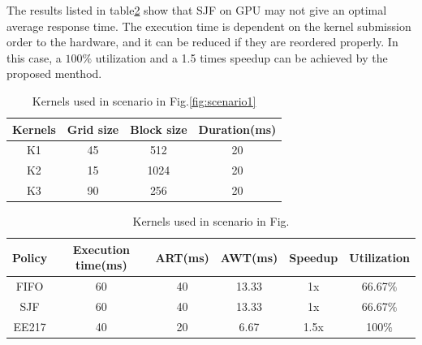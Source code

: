 \documentclass[12pt,journal,compsoc]{IEEEtran}
\begin{document}
 The results listed in table\ref{table:scenario1_result} show that SJF on GPU may not give an optimal average response time. The execution time is dependent on the kernel submission order to the hardware, and it can be reduced if they are reordered properly. In this case, a $100\%$ utilization and a 1.5 times speedup can be achieved by the proposed menthod.

\begin{table}[ht]
   \caption{Kernels used in scenario in Fig.\ref{fig:scenario1}}
   \centering
   \begin{tabular}{|c|c|c|c|}
   \hline
   \bf Kernels & \bf Grid size & \bf Block size & \bf Duration(ms)\\
   \hline
   K1 & 45 & 512 & 20 \\
   K2 & 15 & 1024 & 20\\ 
   K3 & 90 & 256 & 20 \\
   \hline
   \end{tabular}
   \label{table:scenario1_kernel}
\end{table}

\begin{table}[ht]
   \caption{Kernels used in scenario in Fig. } %
   \centering
   \begin{tabular}{|c|c|c|c|c|c|}
   \hline
   \bf Policy & \bf Execution time(ms)& \bf ART(ms) & \bf AWT(ms) & \bf Speedup & \bf Utilization \\
   \hline
   FIFO & 60 & 40 & 13.33 & 1x & 66.67$\%$ \\
   SJF & 60 & 40 & 13.33 & 1x & 66.67$\%$\\ 
   EE217 & 40 & 20 & 6.67 & 1.5x & 100$\%$\\
   \hline
   \end{tabular}
   \label{table:scenario1_result}
\end{table}
\end{document}
